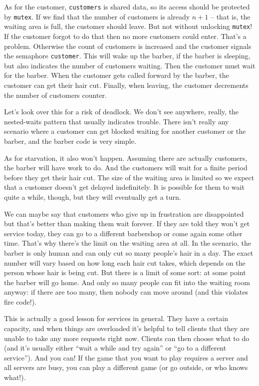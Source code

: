 As for the customer, \texttt{customers} is shared data, so its access should be protected by \texttt{mutex}. If we find that the number of customers is already $n+1$ -- that is, the waiting area is full, the customer should leave. But not without unlocking \texttt{mutex}! If the customer forgot to do that then no more customers could enter. That's a problem. Otherwise the count of customers is increased and the customer signals the semaphore \texttt{customer}. This will wake up the barber, if the barber is sleeping, but also indicates the number of customers waiting. Then the customer must wait for the barber. When the customer gets called forward by the barber, the customer can get their hair cut. Finally, when leaving, the customer decrements the number of customers counter.

Let's look over this for a risk of deadlock. We don't see anywhere, really, the nested-waits pattern that usually indicates trouble. There isn't really any scenario where a customer can get blocked waiting for another customer or the barber, and the barber code is very simple.

As for starvation, it also won't happen. Assuming there are actually customers, the barber will have work to do. And the customers will wait for a finite period before they get their hair cut. The size of the waiting area is limited so we expect that a customer doesn't get delayed indefinitely. It is possible for them to wait quite a while, though, but they will eventually get a turn.

We can maybe say that customers who give up in frustration are disappointed but that's better than making them wait forever. If they are told they won't get service today, they can go to a different barbershop or come again some other time. That's why there's the limit on the waiting area at all. In the scenario, the barber is only human and can only cut so many people's hair in a day. The exact number will vary based on how long each hair cut takes, which depends on the person whose hair is being cut. But there is a limit of some sort: at some point the barber will go home. And only so many people can fit into the waiting room anyway: if there are too many, then nobody can move around (and this violates fire code!).

This is actually a good lesson for services in general. They have a certain capacity, and when things are overloaded it's helpful to tell clients that they are unable to take any more requests right now. Clients can then choose what to do (and it's usually either ``wait a while and try again'' or ``go to a different service''). And you can! If the game that you want to play requires a server and all servers are busy, you can play a different game (or go outside, or who knows what!).


